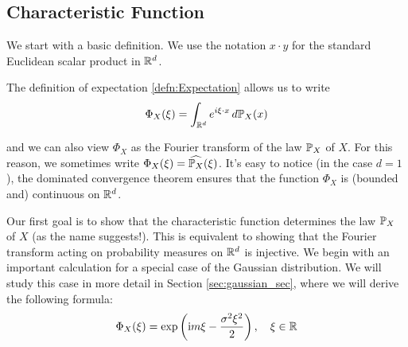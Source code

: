 \documentclass[../Main.tex]{subfiles}
\begin{document}

\subsection{Characteristic Function}
We start with a basic definition. We use the notation $x \cdot y$ for the standard Euclidean scalar product in $\mathbb{R}^d$.


The definition of expectation \ref{defn:Expectation} allows us to write
\[ \Phi_X(\xi) = \int_{\mathbb{R}^d} e^{i \xi \cdot x} \,d\mathbb{P}_X(x) \]

and we can also view $\Phi_X$ as the Fourier transform of the law $\mathbb{P}_X$ of $X$. For this reason, we sometimes write $\Phi_X(\xi) = \widehat{\mathbb{P}_X}(\xi)$. It's easy to notice (in the case $d = 1$), the dominated convergence theorem ensures that the function $\Phi_X$ is (bounded and) continuous on $\mathbb{R}^d$.

Our first goal is to show that the characteristic function determines the law $\mathbb{P}_X$ of $X$ (as the name suggests!). This is equivalent to showing that the Fourier transform acting on probability measures on $\mathbb{R}^d$ is injective. We begin with an important calculation for a special case of the Gaussian distribution. We will study this case in more detail in Section \ref{sec:gaussian_sec}, where we will derive the following formula:
\[ \Phi_X(\xi)=\exp \left(\mathrm{i} m \xi-\frac{\sigma^2 \xi^2}{2}\right), \quad \xi \in \mathbb{R} \]
\end{document}
